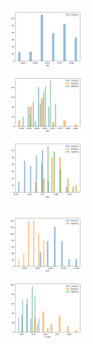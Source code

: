 \documentclass[10pt,a4paper,onecolumn]{article}
\theoremstyle{definition}
\theoremstyle{remark}
\begin{document}
\begin{figure}[htpb!]
\centering
\begin{multicols}{3}
\includegraphics[width=0.33\textwidth]{graficos/histograma_ADJ.png}  \\
\includegraphics[width=0.33\textwidth]{graficos/histograma_ADP.png}  \\
\includegraphics[width=0.33\textwidth]{graficos/histograma_ADV.png}  \\
\end{multicols}
\begin{multicols}{3}
	\includegraphics[width=0.33\textwidth]{graficos/histograma_AUX.png}  \\
	\includegraphics[width=0.33\textwidth]{graficos/histograma_CCONJ.png}  \\

\end{multicols}
\end{figure}
\end{document}
